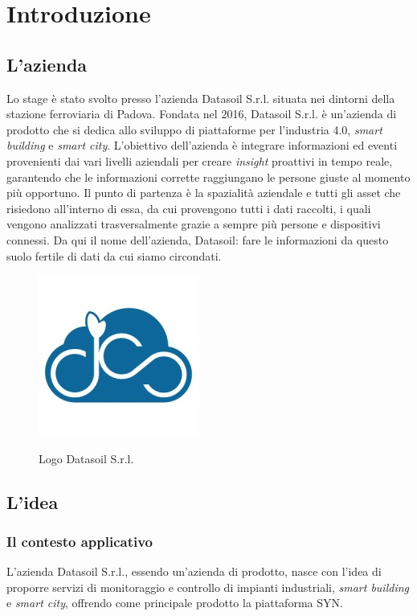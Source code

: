 \chapter{Introduzione}
\label{chap:introduzione}

\section{L'azienda}
Lo stage è stato svolto presso l'azienda Datasoil S.r.l. situata nei dintorni della stazione ferroviaria di Padova.
Fondata nel 2016, Datasoil S.r.l. è un'azienda di prodotto che si dedica allo sviluppo di piattaforme per l'industria 4.0,
\textit{smart building} e \textit{smart city}.
L'obiettivo dell'azienda è integrare informazioni ed eventi provenienti dai vari livelli aziendali per creare \textit{insight} proattivi
in tempo reale, garantendo che le informazioni corrette raggiungano le persone giuste al momento più opportuno.
Il punto di partenza è la spazialità aziendale e tutti gli asset che risiedono all'interno di essa, da cui
provengono tutti i dati raccolti, i quali vengono analizzati trasversalmente grazie a sempre più persone e dispositivi connessi.
Da qui il nome dell'azienda, Datasoil: fare le informazioni da questo suolo fertile di dati da cui siamo circondati.

\begin{figure}[H]
      \centering
      \includegraphics[alt={Logo Datasoil S.r.l.}, width=0.25\columnwidth]{img/datasoil_logo.jpg}
      \caption{Logo Datasoil S.r.l.}
      \label{fig:datasoil}
\end{figure}

\section{L'idea}
\subsection{Il contesto applicativo}
L'azienda Datasoil S.r.l., essendo un'azienda di prodotto, nasce con l'idea di proporre servizi di monitoraggio e controllo
di impianti industriali, \textit{smart building} e \textit{smart city}, offrendo come principale prodotto la piattaforma SYN.

